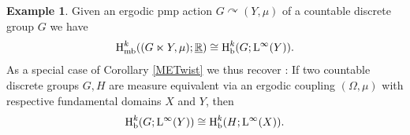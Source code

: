 \documentclass[11pt, oneside]{amsart}
\newtheorem{prop}[lemma]{Proposition}
\theoremstyle{definition}
\newtheorem{example}[lemma]{Example}
\theoremstyle{remark}
\theoremstyle{TheoremNum}
\newcommand{\Hb}{\textup{H}_{\textup{b}}}
\newcommand{\Hmb}{\textup{H}_{\textup{mb}}}
\newcommand{\Linf}{\mathrm{L}^{\infty}}
\newcommand{\cG}{\mathcal{G}}
\newcommand{\OEq}{\overset{\textup{OE}}{\sim}}
\begin{document}
\begin{example}\label{RecoverSaSa} Given an ergodic pmp action $G \curvearrowright (Y, \mu)$ of a countable discrete group $G$ we have
\[
\Hmb^k((G\ltimes Y,\mu);\underline{\mathbb{R}})\cong \Hb^k(G; \Linf(Y)).
\]
As a special case of Corollary \ref{METwist} we thus recover \cite[Theorem 4.6]{MonShal}: If two countable discrete groups $G, H$ are measure equivalent via an ergodic coupling $(\Omega, \mu)$ with respective fundamental domains $X$ and $Y$, then
\[
\Hb^k(G; \Linf(Y)) \cong \Hb^k(H; \Linf(X)).
\]
\end{example}






\end{document}
